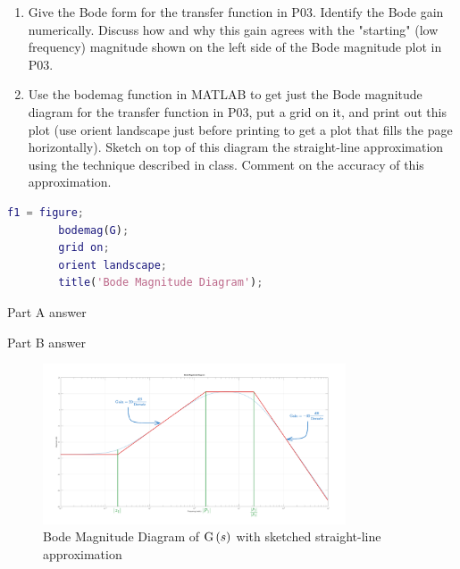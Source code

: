 \begin{hwkProblem}{4}{}

	\begin{enumerate}
		\item Give the Bode form for the transfer function in P03. Identify the Bode gain numerically. Discuss how and why this gain agrees with the "starting" (low frequency) magnitude shown on the left side of the Bode magnitude plot in P03.
		\item Use the bodemag function in MATLAB to get just the Bode magnitude diagram for the transfer function in P03, put a grid on it, and print out this plot (use orient landscape just before printing to get a plot that fills the page horizontally). Sketch on top of this diagram the straight-line approximation using the technique described in class. Comment on the accuracy of this approximation.
	\end{enumerate}

	\hwkSol{}

	\begin{lstlisting}[language={matlab}, label={lst:s04}, caption={MATLAB code for HW05 P04}]
		f1 = figure;
		bodemag(G);
		grid on;
		orient landscape;
		title('Bode Magnitude Diagram');
	\end{lstlisting}

	\hwkPart{}

	Part A answer

	\hwkPart{}

	Part B answer

	\begin{figure}[H]
		\begin{center}
			\includegraphics[width=0.8\textwidth]{./images/s04b.png}
		\end{center}
		\caption{Bode Magnitude Diagram of \( \func{G}[s] \) with sketched straight-line approximation}\label{fig:s04b}
	\end{figure}
	
\end{hwkProblem}


